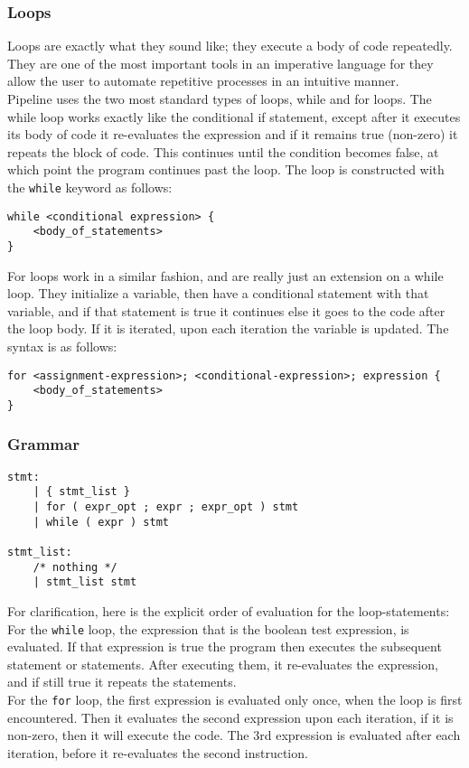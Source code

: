 \documentclass[./Report_main.tex]{subfiles}
\begin{document}
\subsubsection{Loops}
Loops are exactly what they sound like; they execute a body of code repeatedly. They are one of the most important tools in an imperative language for they allow the user to automate repetitive processes in an intuitive manner.\\
Pipeline uses the two most standard types of loops, while and for loops. The while loop works exactly like the conditional if statement, except after it executes its body of code it re-evaluates the expression and if it remains true (non-zero) it repeats the block of code. This continues until the condition becomes false, at which point the program continues past the loop. The loop is constructed with the \texttt{while} keyword as follows:
\begin{lstlisting}
while <conditional expression> {
	<body_of_statements>
}
\end{lstlisting}
For loops work in a similar fashion, and are really just an extension on a while loop. They initialize a variable, then have a conditional statement with that variable, and if that statement is true it continues else it goes to the code after the loop body. If it is iterated, upon each iteration the variable is updated. The syntax is as follows:
\begin{lstlisting}
for <assignment-expression>; <conditional-expression>; expression {
	<body_of_statements>
}
\end{lstlisting}
\subsubsection{Grammar}
\begin{lstlisting}
stmt:
	| { stmt_list }
    | for ( expr_opt ; expr ; expr_opt ) stmt
    | while ( expr ) stmt     
    
stmt_list:
    /* nothing */  
    | stmt_list stmt
\end{lstlisting}
For clarification, here is the explicit order of evaluation for the loop-statements:\\
For the \texttt{while} loop, the expression that is the boolean test expression, is evaluated. If that expression is true the program then executes the subsequent statement or statements. After executing them, it re-evaluates the expression, and if still true it repeats the statements.\\
For the \texttt{for} loop, the first expression is evaluated only once, when the loop is first encountered. Then it evaluates the second expression upon each iteration, if it is non-zero, then it will execute the code. The 3rd expression is evaluated after each iteration, before it re-evaluates the second instruction.
\end{document}
